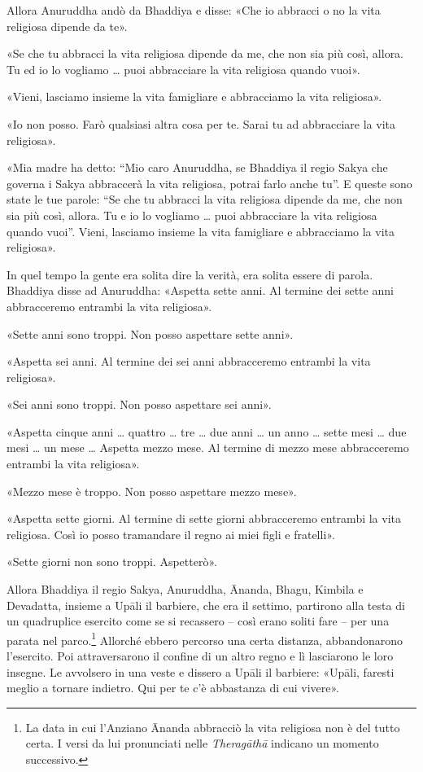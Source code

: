 Allora Anuruddha andò da Bhaddiya e disse: «Che io abbracci o no la vita
religiosa dipende da te».


«Se che tu abbracci la vita religiosa dipende da me, che non sia più
così, allora. Tu ed io lo vogliamo …​ puoi abbracciare la vita
religiosa quando vuoi».


«Vieni, lasciamo insieme la vita famigliare e abbracciamo la vita
religiosa».


«Io non posso. Farò qualsiasi altra cosa per te. Sarai tu ad abbracciare
la vita religiosa».


«Mia madre ha detto: “Mio caro Anuruddha, se Bhaddiya il regio Sakya che
governa i Sakya abbraccerà la vita religiosa, potrai farlo anche tu”. E
queste sono state le tue parole: “Se che tu abbracci la vita religiosa
dipende da me, che non sia più così, allora. Tu e io lo vogliamo …​
puoi abbracciare la vita religiosa quando vuoi”. Vieni, lasciamo insieme
la vita famigliare e abbracciamo la vita religiosa».


In quel tempo la gente era solita dire la verità, era solita essere di
parola. Bhaddiya disse ad Anuruddha: «Aspetta sette anni. Al termine dei
sette anni abbracceremo entrambi la vita religiosa».


«Sette anni sono troppi. Non posso aspettare sette anni».


«Aspetta sei anni. Al termine dei sei anni abbracceremo entrambi la vita
religiosa».


«Sei anni sono troppi. Non posso aspettare sei anni».


«Aspetta cinque anni …​ quattro …​ tre …​ due anni …​ un anno …​
sette mesi …​ due mesi …​ un mese …​ Aspetta mezzo mese. Al termine
di mezzo mese abbracceremo entrambi la vita religiosa».


«Mezzo mese è troppo. Non posso aspettare mezzo mese».


«Aspetta sette giorni. Al termine di sette giorni abbracceremo entrambi
la vita religiosa. Così io posso tramandare il regno ai miei figli e
fratelli».


«Sette giorni non sono troppi. Aspetterò».


Allora Bhaddiya il regio Sakya, Anuruddha, Ānanda, Bhagu, Kimbila e
Devadatta, insieme a Upāli il barbiere, che era il settimo, partirono
alla testa di un quadruplice esercito come se si recassero – così erano
soliti fare – per una parata nel parco.\footnote{La data in cui l’Anziano Ānanda abbracciò la vita religiosa non è del tutto certa. I versi da lui pronunciati nelle \emph{Theragāthā} indicano un momento successivo.} Allorché ebbero
percorso una certa distanza, abbandonarono l’esercito. Poi
attraversarono il confine di un altro regno e lì lasciarono le loro
insegne. Le avvolsero in una veste e dissero a Upāli il barbiere:
«Upāli, faresti meglio a tornare indietro. Qui per te c’è abbastanza di
cui vivere».


